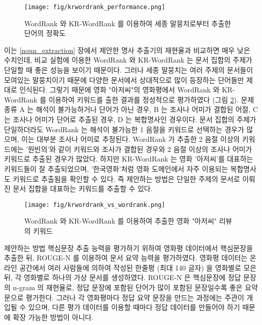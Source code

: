 \documentclass[oneside, ko,phd]{snuthesis_utf8_kor}
\begin{document}
\begin{figure}[H]
\centering
\texttt{[image: fig/krwordrank\_performance.png]}
\caption{WordRank 와 KR-WordRank 를 이용하여 세종 말뭉치로부터 추출한 단어의 정확도}
\label{fig:krwordrank_performance}
\end{figure}

이는 \ref{noun_extraction} 장에서 제안한 명사 추출기의 재현율과 비교하면 매우 낮은 수치인데, 비교 실험에 이용한 WordRank 와 KR-WordRank 는 문서 집합의 주제가 단일할 때 좋은 성능을 보이기 때문이다.
그러나 세종 말뭉치는 여러 주제의 문서들이 모여있는 말뭉치이기 때문에 다양한 문서에서 상대적으로 많이 등장하는 단어들만 제대로 인식된다.
그렇기 때문에 영화 "아저씨"의 영화평에서 WordRank 와 KR-WordRank 를 이용하여 키워드를 출한 결과를 정성적으로 평가하였다 (그림 \ref{fig:krwordrank_vs_wordrank}).
문제 종류 A 는 해석이 불가능하거나 단어가 아닌 경우, B 는 조사나 어미가 결합된 어절, C 는 조사나 어미가 단어로 추출된 경우, D 는 복합명사인 경우이다.
문서 집합의 주제가 단일하더라도 WordRank 는 해석이 불가능한 1 음절을 키워드로 선택하는 경우가 많으며, 이는 대부분 조사나 어미로 추정된다.
WordRank 가 추출한 2 음절 이상의 키워드에는 '원빈의'와 같이 키워드와 조사가 결합된 경우와 2 음절 이상의 조사나 어미가 키워드로 추출된 경우가 많았다.
하지만 KR-WordRank 는 영화 '아저씨'를 대표하는 키워드들이 잘 추출되었으며, '한국영화'처럼 영화 도메인에서 자주 이용되는 복합명사도 키워드로 추출됨을 확인할 수 있다.
즉 제안하는 방법은 단일한 주제의 문서로 이뤄진 문서 집합을 대표하는 키워드를 추출할 수 있다.

\begin{figure}[H]
\centering
\texttt{[image: fig/krwordrank\_vs\_wordrank.png]}
\caption{WordRank 와 KR-WordRank 를 이용하여 추출한 영화 "아저씨" 리뷰의 키워드}
\label{fig:krwordrank_vs_wordrank}
\end{figure}

제안하는 방법 핵심문장 추출 능력을 평가하기 위하여 영화평 데이터에서 핵심문장을 추출한 뒤, ROUGE-N \cite{lin2004rouge} 를 이용하여 문서 요약 능력을 평가하였다.
영화평 데이터는 온라인 공간에서 여러 사람들에 의하여 작성된 한줄평 (최대 140 글자) 을 영화별로 모은 뒤, 각 영화별로 하나의 가상 문서를 생성하였다.
ROUGE-N 은 핵심문장에 정답 문장의 n-gram 의 재현율로, 정답 문장에 포함된 단어가 많이 포함된 문장일수록 좋은 요약문으로 평가한다.
그러나 각 영화평마다 정답 요약 문장을 만드는 과정에는 주관이 개입될 수 있으며, 다른 평가 데이터를 이용할 때마다 정답 데이터를 만들어야 하기 때문에 확장 가능한 방법이 아니다.
\end{document}
